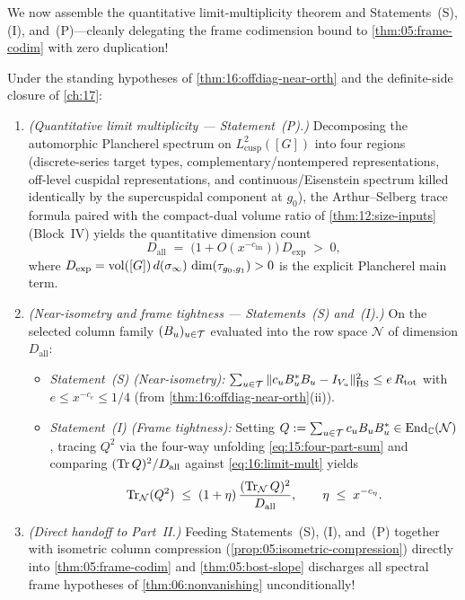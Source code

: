 We now assemble the quantitative limit-multiplicity theorem and Statements~(S), (I), and~(P)—cleanly delegating the frame codimension bound to \cref{thm:05:frame-codim} with zero duplication!

\begin{theorem}
\label{thm:16:limit-mult-sip}
Under the standing hypotheses of \cref{thm:16:offdiag-near-orth} and the definite-side closure of \cref{ch:17}:
\begin{enumerate}[label=\textup{(\roman*)}]
\item \emph{(Quantitative limit multiplicity — Statement~(P).)} Decomposing the automorphic Plancherel spectrum on $L^2_{\mathrm{cusp}}([G])$ into four regions (discrete-series target types, complementary/nontempered representations, off-level cuspidal representations, and continuous/Eisenstein spectrum killed identically by the supercuspidal component at $g_0$), the Arthur--Selberg trace formula paired with the compact-dual volume ratio of \cref{thm:12:size-inputs} (Block~IV) yields the quantitative dimension count
  \begin{equation}
  \label{eq:16:limit-mult}
    D_{\mathrm{all}} \;=\; \bigl(1 + O(x^{-c_{\mathrm{lm}}})\bigr)\, D_{\mathrm{exp}} \;>\; 0,
  \end{equation}
  where $D_{\mathrm{exp}} = \operatorname{vol}([G])\, d(\sigma_\infty)\, \dim(\tau_{g_0, g_1}) > 0$ is the explicit Plancherel main term.
\item \emph{(Near-isometry and frame tightness — Statements~(S) and~(I).)} On the selected column family $(B_u)_{u \in \mathcal{T}}$ evaluated into the row space $\mathcal{N}$ of dimension $D_{\mathrm{all}}$:
  \begin{itemize}
  \item \emph{Statement~(S) (Near-isometry):} $\sum_{u \in \mathcal{T}} \|c_u B_u^* B_u - I_{V_u}\|_{\mathrm{HS}}^2 \le e\, R_{\mathrm{tot}}$ with $e \le x^{-c_e} \le 1/4$ (from \cref{thm:16:offdiag-near-orth}(ii)).
  \item \emph{Statement~(I) (Frame tightness):} Setting $Q := \sum_{u \in \mathcal{T}} c_u B_u B_u^* \in \mathrm{End}_{\mathbb{C}}(\mathcal{N})$, tracing $Q^2$ via the four-way unfolding \eqref{eq:15:four-part-sum} and comparing $(\operatorname{Tr} Q)^2 / D_{\mathrm{all}}$ against \eqref{eq:16:limit-mult} yields
    \begin{equation}
    \label{eq:16:frame-tight}
      \operatorname{Tr}_{\mathcal{N}}(Q^2) \;\le\; (1 + \eta)\,\frac{(\operatorname{Tr}_{\mathcal{N}} Q)^2}{D_{\mathrm{all}}},
      \qquad \eta \;\le\; x^{-c_\eta}.
    \end{equation}
  \end{itemize}
\item \emph{(Direct handoff to Part~II.)} Feeding Statements~(S), (I), and~(P) together with isometric column compression (\cref{prop:05:isometric-compression}) directly into \cref{thm:05:frame-codim} and \cref{thm:05:bost-slope} discharges all spectral frame hypotheses of \cref{thm:06:nonvanishing} unconditionally!
\end{enumerate}
\end{theorem}
